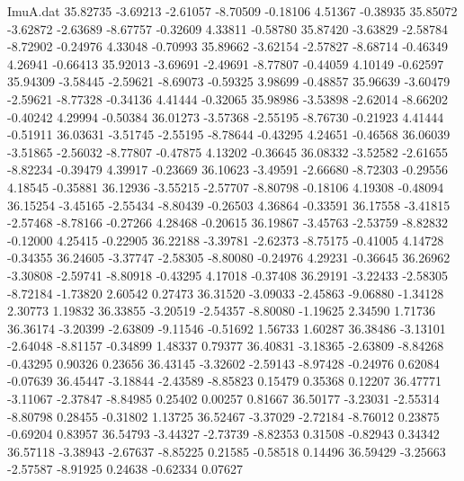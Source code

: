\begin{filecontents}{ImuA.dat}
  35.82735   -3.69213   -2.61057   -8.70509   -0.18106    4.51367   -0.38935
  35.85072   -3.62872   -2.63689   -8.67757   -0.32609    4.33811   -0.58780
  35.87420   -3.63829   -2.58784   -8.72902   -0.24976    4.33048   -0.70993
  35.89662   -3.62154   -2.57827   -8.68714   -0.46349    4.26941   -0.66413
  35.92013   -3.69691   -2.49691   -8.77807   -0.44059    4.10149   -0.62597
  35.94309   -3.58445   -2.59621   -8.69073   -0.59325    3.98699   -0.48857
  35.96639   -3.60479   -2.59621   -8.77328   -0.34136    4.41444   -0.32065
  35.98986   -3.53898   -2.62014   -8.66202   -0.40242    4.29994   -0.50384
  36.01273   -3.57368   -2.55195   -8.76730   -0.21923    4.41444   -0.51911
  36.03631   -3.51745   -2.55195   -8.78644   -0.43295    4.24651   -0.46568
  36.06039   -3.51865   -2.56032   -8.77807   -0.47875    4.13202   -0.36645
  36.08332   -3.52582   -2.61655   -8.82234   -0.39479    4.39917   -0.23669
  36.10623   -3.49591   -2.66680   -8.72303   -0.29556    4.18545   -0.35881
  36.12936   -3.55215   -2.57707   -8.80798   -0.18106    4.19308   -0.48094
  36.15254   -3.45165   -2.55434   -8.80439   -0.26503    4.36864   -0.33591
  36.17558   -3.41815   -2.57468   -8.78166   -0.27266    4.28468   -0.20615
  36.19867   -3.45763   -2.53759   -8.82832   -0.12000    4.25415   -0.22905
  36.22188   -3.39781   -2.62373   -8.75175   -0.41005    4.14728   -0.34355
  36.24605   -3.37747   -2.58305   -8.80080   -0.24976    4.29231   -0.36645
  36.26962   -3.30808   -2.59741   -8.80918   -0.43295    4.17018   -0.37408
  36.29191   -3.22433   -2.58305   -8.72184   -1.73820    2.60542    0.27473
  36.31520   -3.09033   -2.45863   -9.06880   -1.34128    2.30773    1.19832
  36.33855   -3.20519   -2.54357   -8.80080   -1.19625    2.34590    1.71736
  36.36174   -3.20399   -2.63809   -9.11546   -0.51692    1.56733    1.60287
  36.38486   -3.13101   -2.64048   -8.81157   -0.34899    1.48337    0.79377
  36.40831   -3.18365   -2.63809   -8.84268   -0.43295    0.90326    0.23656
  36.43145   -3.32602   -2.59143   -8.97428   -0.24976    0.62084   -0.07639
  36.45447   -3.18844   -2.43589   -8.85823    0.15479    0.35368    0.12207
  36.47771   -3.11067   -2.37847   -8.84985    0.25402    0.00257    0.81667
  36.50177   -3.23031   -2.55314   -8.80798    0.28455   -0.31802    1.13725
  36.52467   -3.37029   -2.72184   -8.76012    0.23875   -0.69204    0.83957
  36.54793   -3.44327   -2.73739   -8.82353    0.31508   -0.82943    0.34342
  36.57118   -3.38943   -2.67637   -8.85225    0.21585   -0.58518    0.14496
  36.59429   -3.25663   -2.57587   -8.91925    0.24638   -0.62334    0.07627

\end{filecontents}
